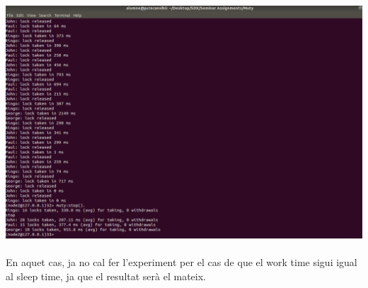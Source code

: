 \documentclass[a4paper, 10pt]{article}
\begin{document}
\begin{enumerate}
\includegraphics[width=\textwidth]{lock-2}
\\\\En aquet cas, ja no cal fer l'experiment per el cas de que el work time sigui igual al sleep time, ja que el resultat serà el mateix.

\end{enumerate}

\newpage
\end{document}
